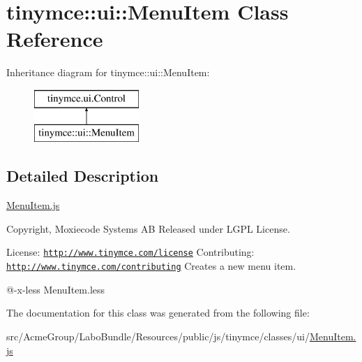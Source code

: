 \hypertarget{classtinymce_1_1ui_1_1_menu_item}{\section{tinymce\+:\+:ui\+:\+:Menu\+Item Class Reference}
\label{classtinymce_1_1ui_1_1_menu_item}
}
Inheritance diagram for tinymce\+:\+:ui\+:\+:Menu\+Item\+:\begin{figure}[H]
\begin{center}
\leavevmode
\includegraphics[height=2.000000cm]{classtinymce_1_1ui_1_1_menu_item}
\end{center}
\end{figure}


\subsection{Detailed Description}
\hyperlink{_menu_item_8js}{Menu\+Item.\+js}

Copyright, Moxiecode Systems A\+B Released under L\+G\+P\+L License.

License\+: \href{http://www.tinymce.com/license}{\tt http\+://www.\+tinymce.\+com/license} Contributing\+: \href{http://www.tinymce.com/contributing}{\tt http\+://www.\+tinymce.\+com/contributing} Creates a new menu item.

@-\/x-\/less Menu\+Item.\+less 

The documentation for this class was generated from the following file\+:\begin{DoxyCompactItemize}
\item 
src/\+Acme\+Group/\+Labo\+Bundle/\+Resources/public/js/tinymce/classes/ui/\hyperlink{_menu_item_8js}{Menu\+Item.\+js}\end{DoxyCompactItemize}
